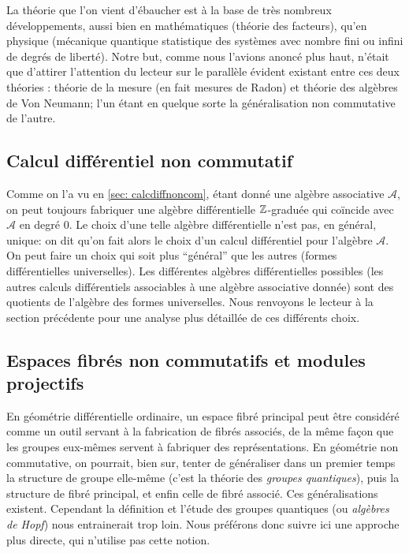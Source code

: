 La th\'eorie que l'on vient d'\'ebaucher est \`a 
la base de tr\`es nombreux d\'eveloppements, aussi bien en math\'ematiques (th\'eorie 
des facteurs), qu'en physique (m\'ecanique quantique statistique des 
syst\`emes avec nombre fini ou infini de degr\'es de libert\'e). Notre but, 
comme nous l'avions anonc\'e plus haut, n'\'etait que d'attirer 
l'attention du lecteur sur le parall\`ele \'evident existant entre ces 
deux th\'eories : th\'eorie de la mesure (en fait mesures de Radon) et 
th\'eorie des alg\`ebres de Von Neumann; l'un \'etant en quelque sorte la g\'en\'eralisation non 
commutative de l'autre. 

\subsection{Calcul diff\'erentiel non commutatif}

Comme on l'a vu en \ref{sec: calcdiffnoncom}, \'etant donn\'e une alg\`ebre 
associative  ${\mathcal A}$, on peut toujours fabriquer une alg\`ebre 
diff\'erentielle $\mathbb{Z}$-gradu\'ee qui co\"incide avec ${\mathcal A}$ en 
degr\'e $0$. Le choix d'une telle alg\`ebre diff\'erentielle n'est pas, en 
g\'en\'eral, unique: on dit qu'on fait alors le choix d'un calcul 
diff\'erentiel pour l'alg\`ebre ${\mathcal A}$. On peut faire un choix 
qui soit plus ``g\'en\'eral'' que les autres (formes diff\'erentielles 
universelles). Les diff\'erentes alg\`ebres diff\'erentielles possibles (les autres 
calculs diff\'erentiels associables \`a une alg\`ebre associative donn\'ee) sont des quotients de l'alg\`ebre 
des formes universelles. Nous renvoyons le lecteur \`a la section 
pr\'ec\'edente pour une analyse plus d\'etaill\'ee de ces diff\'erents choix.

\subsection{Espaces fibr\'es non commutatifs et modules projectifs}

En g\'eom\'etrie diff\'erentielle ordinaire, un espace fibr\'e 
principal peut \^etre consid\'er\'e comme un  outil servant \`a 
la fabrication de fibr\'es associ\'es, de la m\^eme fa\c con que les 
groupes eux-m\^emes servent \`a fabriquer des
repr\'esentations. En g\'eom\'etrie non commutative, on
pourrait, bien sur,  tenter de g\'en\'eraliser dans un premier
temps la structure de groupe  elle-m\^eme (c'est la th\'eorie
des {\sl groupes quantiques\/}),  puis la structure de fibr\'e
principal, et enfin celle de  fibr\'e associ\'e. Ces
g\'en\'eralisations existent. Cependant la  d\'efinition et
l'\'etude des groupes quantiques (ou {\sl alg\`ebres de
Hopf\/}) nous  entrainerait trop loin. Nous pr\'ef\'erons donc
suivre ici une approche plus  directe, qui n'utilise pas cette
notion.

